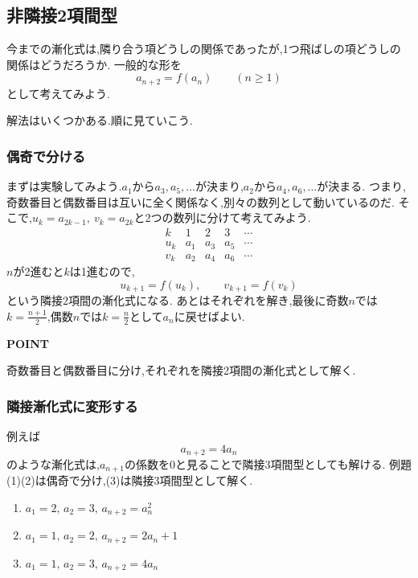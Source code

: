 \subsection{非隣接2項間型}\label{節：非隣接2項型}
  今までの漸化式は,隣り合う項どうしの関係であったが,1つ飛ばしの項どうしの関係はどうだろうか.
  一般的な形を
  \[
    a_{n+2}=f(a_n)\qquad(n\ge1)
  \]
  として考えてみよう.
  
  解法はいくつかある.順に見ていこう.
  \subsubsection{偶奇で分ける}\label{節：偶奇で分ける}
    
    まずは実験してみよう.$a_1$から$a_3,a_5,\ldots$が決まり,$a_2$から$a_4,a_6,\ldots$が決まる.
    つまり,奇数番目と偶数番目は互いに全く関係なく,別々の数列として動いているのだ.
    そこで,$u_k=a_{2k-1},\ v_k=a_{2k}$と2つの数列に分けて考えてみよう.
    \[
      \begin{array}{c|cccc}
        k&1&2&3&\cdots\\ \hline
        u_k&a_1&a_3&a_5&\cdots\\
        v_k&a_2&a_4&a_6&\cdots
      \end{array}
    \]
    $n$が2進むと$k$は1進むので,
    \[
      u_{k+1}=f(u_k),\qquad v_{k+1}=f(v_k)
    \]
    という隣接2項間の漸化式になる.
    あとはそれぞれを解き,最後に奇数$n$では$k=\frac{n+1}{2}$,偶数$n$では$k=\frac{n}{2}$として$a_n$に戻せばよい.
    
    \begin{bookpoint}
      \textbf{POINT}\par
      奇数番目と偶数番目に分け,それぞれを隣接2項間の漸化式として解く.
    \end{bookpoint}
  
  \subsubsection{隣接漸化式に変形する}\label{節：隣接漸化式に変形する}
    例えば
    \[
      a_{n+2}=4a_n
    \]
    のような漸化式は,$a_{n+1}$の係数を$0$と見ることで隣接3項間型としても解ける.
    例題(1)(2)は偶奇で分け,(3)は隣接3項間型として解く.
  
  \noindent {}\par\nobreak
  \begin{enumerate}[label=(\arabic*),parsep=3pt,format=\bookitemlink{example-nonadjacent-1}{problem}{hint}]
    \item $a_1=2,\,a_2=3,\,a_{n+2}=a_n^2$
    \item $a_1=1,\,a_2=2,\,a_{n+2}=2a_n+1$
    \item $a_1=1,\,a_2=3,\,a_{n+2}=4a_n$
  \end{enumerate}
  
